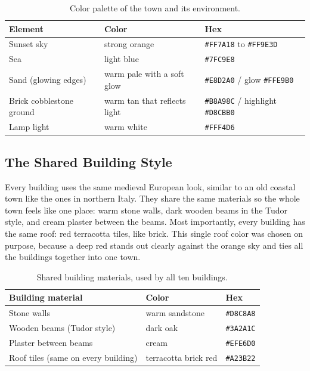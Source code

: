 \documentclass[12pt,letterpaper]{article}
\begin{document}
\begin{table}[H]
\centering
\footnotesize
\begin{tabular}{|p{4cm}|p{6.5cm}|p{4cm}|}
\hline
\textbf{Element} & \textbf{Color} & \textbf{Hex} \\
\hline
Sunset sky & strong orange & \texttt{\#FF7A18} to \texttt{\#FF9E3D} \\
\hline
Sea & light blue & \texttt{\#7FC9E8} \\
\hline
Sand (glowing edges) & warm pale with a soft glow & \texttt{\#E8D2A0} / glow \texttt{\#FFE9B0} \\
\hline
Brick cobblestone ground & warm tan that reflects light & \texttt{\#B8A98C} / highlight \texttt{\#D8CBB0} \\
\hline
Lamp light & warm white & \texttt{\#FFF4D6} \\
\hline
\end{tabular}
\caption{Color palette of the town and its environment.}
\end{table}

\subsection{The Shared Building Style}

Every building uses the same medieval European look, similar to an old coastal town like the ones in northern Italy. They share the same materials so the whole town feels like one place: warm stone walls, dark wooden beams in the Tudor style, and cream plaster between the beams. Most importantly, every building has the same roof: red terracotta tiles, like brick. This single roof color was chosen on purpose, because a deep red stands out clearly against the orange sky and ties all the buildings together into one town.

\begin{table}[H]
\centering
\footnotesize
\begin{tabular}{|p{5.5cm}|p{5cm}|p{4cm}|}
\hline
\textbf{Building material} & \textbf{Color} & \textbf{Hex} \\
\hline
Stone walls & warm sandstone & \texttt{\#D8C8A8} \\
\hline
Wooden beams (Tudor style) & dark oak & \texttt{\#3A2A1C} \\
\hline
Plaster between beams & cream & \texttt{\#EFE6D0} \\
\hline
Roof tiles (same on every building) & terracotta brick red & \texttt{\#A23B22} \\
\hline
\end{tabular}
\caption{Shared building materials, used by all ten buildings.}
\end{table}
\end{document}
